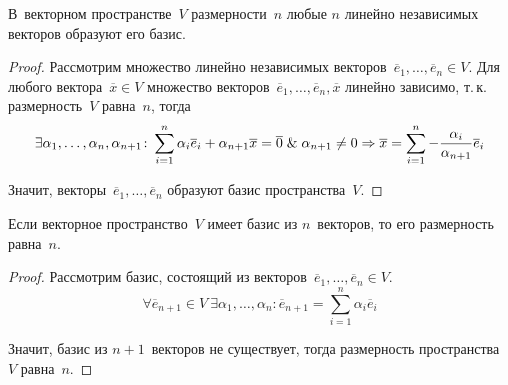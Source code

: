 \begin{theorem}
В~векторном пространстве~$V$ размерности~$n$ любые $n$ линейно независимых векторов образуют его базис.
\end{theorem}
\begin{proof}
Рассмотрим множество линейно независимых векторов~$\overline e_1, \ldots, \overline e_n \in V$.
Для любого вектора~$\overline x \in V$ множество векторов~$\overline e_1, \ldots, \overline e_n, \overline x$ линейно зависимо, т.\,к. размерность~$V$ равна~$n$, тогда
\begin{equation*}
\exists \alpha_1, \ldots, \alpha_n, \alpha_{n+1} \colon
\sum_{i=1}^n \alpha_i \overline e_i + \alpha_{n+1} \overline x = \overline 0 \mathrel{\&} \alpha_{n+1} \neq 0 \Rightarrow
\overline x = \sum_{i=1}^n -\frac{\alpha_i}{\alpha_{n+1}} \overline e_i
\end{equation*}

Значит, векторы~$\overline e_1, \ldots, \overline e_n$ образуют базис пространства~$V$.
\end{proof}

\begin{theorem}
Если векторное пространство~$V$ имеет базис из $n$~векторов, то его размерность равна~$n$.
\end{theorem}
\begin{proof}
Рассмотрим базис, состоящий из векторов~$\overline e_1, \ldots, \overline e_n \in V$.
\begin{equation*}
\forall \overline e_{n+1} \in V \
\exists \alpha_1, \ldots, \alpha_n \colon
\overline e_{n+1} = \sum_{i=1}^n \alpha_i \overline e_i
\end{equation*}

Значит, базис из $n + 1$~векторов не существует, тогда размерность пространства~$V$ равна~$n$.
\end{proof}
